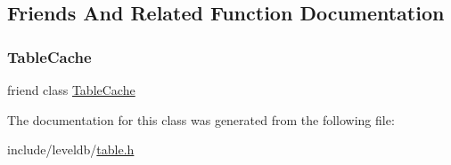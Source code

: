 \subsection{Friends And Related Function Documentation}
\mbox{\label{classleveldb_1_1_table_ae1e5f7bae4682672cfcc68d0add43199}} 
\subsubsection{\texorpdfstring{TableCache}{TableCache}}
{\footnotesize\ttfamily friend class \mbox{\hyperlink{classleveldb_1_1_table_cache}{Table\+Cache}}\hspace{0.3cm}{\ttfamily [friend]}}



The documentation for this class was generated from the following file\+:\begin{DoxyCompactItemize}
\item 
include/leveldb/\mbox{\hyperlink{table_8h}{table.\+h}}\end{DoxyCompactItemize}
